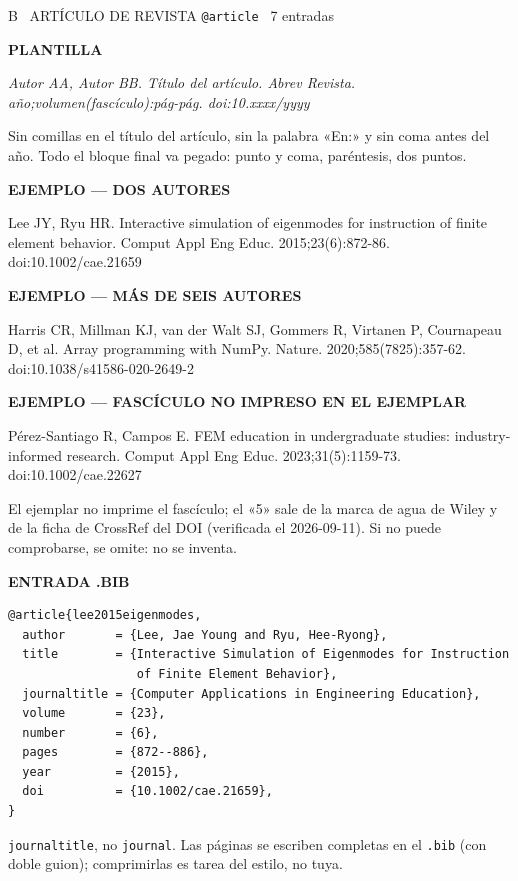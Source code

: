 \documentclass[11pt,a4paper]{article}
\newcommand{\rot}[1]{\vspace{2pt}\par{\footnotesize\bfseries\color{gris}\MakeUppercase{#1}}\par\vspace{1pt}}
\newcommand{\refv}[1]{\par{\small #1}\par}
\newcommand{\plantilla}[1]{\par{\small\itshape\color{tinta} #1}\par}
\newcommand{\anot}[1]{{\color{gris}\footnotesize #1}}
\begin{document}
\begin{ficha}{B \textperiodcentered\ ARTÍCULO DE REVISTA \hfill \normalfont\texttt{@article} \textperiodcentered\ 7 entradas}
\rot{plantilla}
\plantilla{Autor AA, Autor BB. Título del artículo. Abrev Revista.
año;volumen(fascículo):pág-pág. doi:10.xxxx/yyyy}
\anot{Sin comillas en el título del artículo, sin la palabra «En:» y sin coma antes del año.
Todo el bloque final va pegado: punto y coma, paréntesis, dos puntos.}

\rot{ejemplo --- dos autores}
\refv{Lee JY, Ryu HR. Interactive simulation of eigenmodes for instruction of finite element
behavior. Comput Appl Eng Educ. 2015;23(6):872-86. doi:10.1002/cae.21659}

\rot{ejemplo --- más de seis autores}
\refv{Harris CR, Millman KJ, van der Walt SJ, Gommers R, Virtanen P, Cournapeau D, et al.
Array programming with NumPy. Nature. 2020;585(7825):357-62.
doi:10.1038/s41586-020-2649-2}

\rot{ejemplo --- fascículo no impreso en el ejemplar}
\refv{Pérez-Santiago R, Campos E. FEM education in undergraduate studies: industry-informed
research. Comput Appl Eng Educ. 2023;31(5):1159-73. doi:10.1002/cae.22627}
\anot{El ejemplar no imprime el fascículo; el «5» sale de la marca de agua de Wiley y de la
ficha de CrossRef del DOI (verificada el 2026-09-11). Si no puede comprobarse, se omite:
no se inventa.}

\rot{entrada .bib}
\begin{Verbatim}[fontsize=\small,xleftmargin=4pt]
@article{lee2015eigenmodes,
  author       = {Lee, Jae Young and Ryu, Hee-Ryong},
  title        = {Interactive Simulation of Eigenmodes for Instruction
                  of Finite Element Behavior},
  journaltitle = {Computer Applications in Engineering Education},
  volume       = {23},
  number       = {6},
  pages        = {872--886},
  year         = {2015},
  doi          = {10.1002/cae.21659},
}
\end{Verbatim}
\anot{\texttt{journaltitle}, no \texttt{journal}. Las páginas se escriben completas en el
\texttt{.bib} (con doble guion); comprimirlas es tarea del estilo, no tuya.}
\end{ficha}
\end{document}
